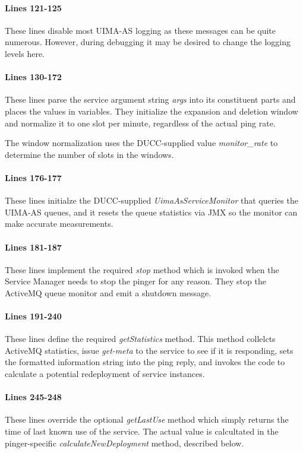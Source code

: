     \paragraph{Lines 121-125}
    These lines disable most UIMA-AS logging as these messages can be quite
    numerous.  However, during debugging it may be desired to change the logging
    levels here.

    \paragraph{Lines 130-172}
    These lines parse the service argument string {\em args} into its constituent
    parts and places the values in variables.  They initialize the expansion
    and deletion window and normalize it to one slot per minute, regardless of
    the actual ping rate.

    The window normalization uses the DUCC-supplied value {\em monitor\_rate}
    to determine the number of slots in the windows.
   
    \paragraph{Lines 176-177}
    These lines initialze the DUCC-supplied {\em UimaAsServiceMonitor} that
    queries the UIMA-AS queues, and it resets the queue statistics via JMX so the
    monitor can make accurate measurements.

    \paragraph{Lines 181-187}
    These lines implement the required {\em stop} method which is invoked when
    the Service Manager needs to stop the pinger for any reason.  They stop the
    ActiveMQ queue monitor and emit a shutdown message.

    \paragraph{Lines 191-240}
    These lines define the required {\em getStatistics} method.  This 
    method collelcts ActiveMQ statistics, issue {\em get-meta} to the
    service to see if it is responding, sets the formatted information
    string into the ping reply, and invokes the code to calculate a
    potential redeployment of service instances.

    \paragraph{Lines 245-248}
    These lines override the optional {\em getLastUse} method which
    simply returns the time of last known use of the service.  The actual
    value is calcultated in the pinger-specific {\em calculateNewDeployment}
    method, described below.

